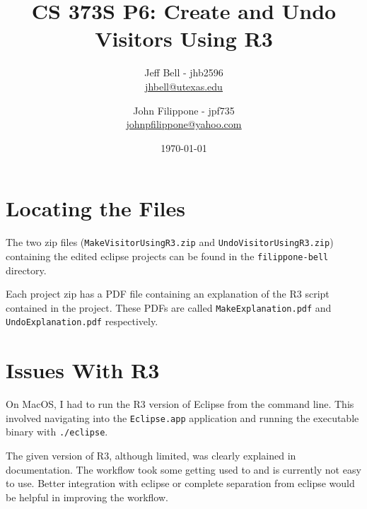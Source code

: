 \documentclass[12pt, letterpaper]{article}
\title{CS 373S P6: Create and Undo Visitors Using R3}
\author{
	Jeff Bell - jhb2596 \\ \underline{\href{mailto:jhbell@utexas.edu}{jhbell@utexas.edu}}
	\and
	John Filippone - jpf735  \\ \underline{\href{mailto:johnpfilippone@yahoo.com}{johnpfilippone@yahoo.com}}
}
\date{\today}
\begin{document}
\maketitle

\section*{Locating the Files}
The two zip files (\texttt{MakeVisitorUsingR3.zip} and \texttt{UndoVisitorUsingR3.zip})
containing the edited eclipse projects can be found in the \texttt{filippone-bell} directory.

Each project zip has a PDF file containing an explanation of the R3 script contained in 
the project. These PDFs are called \texttt{MakeExplanation.pdf} and \texttt{UndoExplanation.pdf}
respectively.

\section*{Issues With R3}
On MacOS, I had to run the R3 version of Eclipse from the command line. This involved navigating
into the \texttt{Eclipse.app} application and running the executable binary with \texttt{./eclipse}.

The given version of R3, although limited, was clearly explained in documentation. The workflow took
some getting used to and is currently not easy to use. Better integration with eclipse or complete separation from
eclipse would be helpful in improving the workflow.
\end{document}

